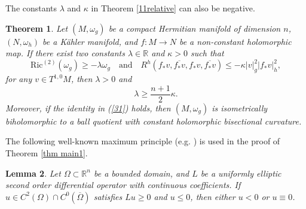 \documentclass[12pt]{amsart}
\theoremstyle{plain}
\newtheorem{thm}{Theorem}[section]
\newtheorem{lemma}[thm]{Lemma}
\theoremstyle{definition}
\newcommand{\btheorem}{\begin{thm}}
\newcommand{\etheorem}{\end{thm}}
\newcommand{\elemma}{\end{lemma}}
\newcommand{\blemma}{\begin{lemma}}
\renewcommand{\bar}{\overline}
\newcommand{\beq}{\begin{equation}}
\newcommand{\eeq}{\end{equation}}
\renewcommand{\hat}{\widehat}
\newcommand{\qtq}[1]{\quad\mbox{#1}\quad}
\newcommand{\Om}{\Omega}
\renewcommand{\>}{\rightarrow}
\newcommand{\R}{{\mathbb R}}
\newcommand{\Ric}{\mathrm{Ric}}
\newcommand{\om}{\omega}
\numberwithin{equation}{section} %
\begin{document}
\baselineskip


\noindent  The constants $\lambda$ and $\kappa$ in Theorem \ref{11relative}  can also be negative.

\btheorem\label{special1} Let $(M,\om_g)$ be a compact Hermitian manifold of dimension $n$, $(N,\om_h)$ be a K\"ahler manifold,
and $f:M\to N$ be a non-constant holomorphic map.
If there exist two constants $\lambda\in \R$ and $\kappa>0$ such that 
\beq 
\Ric^{\mathrm{(2)}}(\omega_g)\ge -\lambda \omega_g\qtq{and} R^h\left(f_*v,\bar{f_*v}, f_*v,\bar {f_*v}\right)\le- \kappa |v|^2_g |f_*v|^2_h, 
\eeq 	
for any $v\in T^{1,0}M$,
then $\lambda >0$ and
\beq
\lambda\geq \frac{n+1}{2}\kappa.\label{31}
\eeq
Moreover, if the identity in (\ref{31}) holds, then $(M,\om_g)$ is isometrically biholomorphic to  a ball quotient with constant holomorphic bisectional curvature.
\etheorem


\baselineskip


\noindent The following well-known maximum principle (e.g. \cite[Theorem~2.10]{HL11}) is used in the proof of Theorem \ref{thm main1}.
\blemma\label{lem PDE}
Let $\Om \subset \R^n$ be a bounded domain, and $L$ be a uniformly elliptic second order differential operator with continuous coefficients.
If $u\in C^2(\Om)\cap C^0(\bar \Om)$ satisfies $Lu\ge 0$ and $u\le 0$,
then either $u<0$ or $u\equiv 0$.
\elemma
\end{document}
